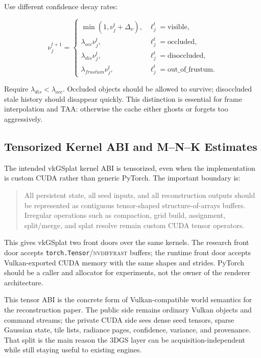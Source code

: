 \documentclass[11pt]{article}
\begin{document}
Use different confidence decay rates:

\[
  \nu_j^{t+1} =
  \begin{cases}
    \min(1,\nu_j^t+\Delta_\nu), & \ell_j^t=\mathrm{visible},\\
    \lambda_{occ}\nu_j^t, & \ell_j^t=\mathrm{occluded},\\
    \lambda_{dis}\nu_j^t, & \ell_j^t=\mathrm{disoccluded},\\
    \lambda_{frustum}\nu_j^t, & \ell_j^t=\mathrm{out\_of\_frustum}.
  \end{cases}
\]

Require $\lambda_{dis}<\lambda_{occ}$. Occluded objects should be allowed to
survive; disoccluded stale history should disappear quickly. This distinction
is essential for frame interpolation and TAA: otherwise the cache either ghosts
or forgets too aggressively.


\subsection{Tensorized Kernel ABI and M--N--K Estimates}

The intended vkGSplat kernel ABI is tensorized, even when the implementation is
custom CUDA rather than generic PyTorch. The important boundary is:

\begin{quote}
All persistent state, all seed inputs, and all reconstruction outputs should be
represented as contiguous tensor-shaped structure-of-arrays buffers. Irregular
operations such as compaction, grid build, assignment, split/merge, and splat
resolve remain custom CUDA tensor operators.
\end{quote}

This gives vkGSplat two front doors over the same kernels. The research front
door accepts \texttt{torch.Tensor}/\textsc{nvdiffrast} buffers; the runtime
front door accepts Vulkan-exported CUDA memory with the same shapes and
strides. PyTorch should be a caller and allocator for experiments, not the
owner of the renderer architecture.

This tensor ABI is the concrete form of Vulkan-compatible world semantics for
the reconstruction paper. The public side remains ordinary Vulkan objects and
command streams; the private CUDA side sees dense seed tensors, sparse Gaussian
state, tile lists, radiance pages, confidence, variance, and provenance. That
split is the main reason the 3DGS layer can be acquisition-independent while
still staying useful to existing engines.
\end{document}
